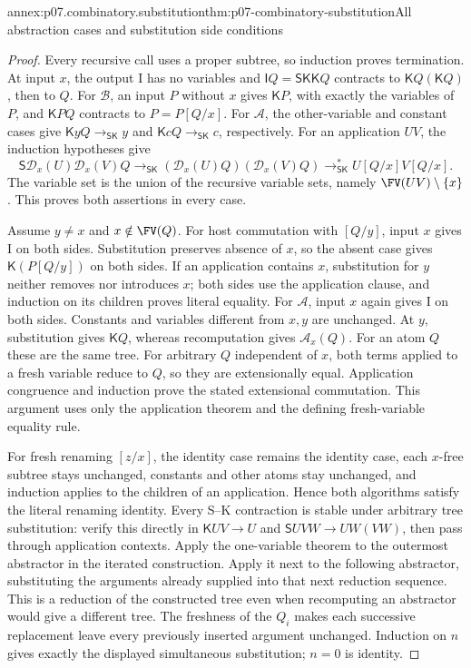 \begin{annexitem}{annex:p07.combinatory.substitution}{thm:p07-combinatory-substitution}{All abstraction cases and substitution side conditions}
\begin{proof}
Every recursive call uses a proper subtree, so induction proves termination.
At input \(x\), the output I has no variables and
\(\mathsf I Q=\mathsf S\mathsf K\mathsf KQ\) contracts to
\(\mathsf KQ(\mathsf KQ)\), then to \(Q\).
For \(\mathcal B\), an input \(P\) without \(x\) gives \(\mathsf KP\),
with exactly the variables of \(P\), and \(\mathsf KPQ\) contracts to
\(P=P[Q/x]\).  For \(\mathcal A\), the other-variable and constant cases
give \(\mathsf KyQ\longrightarrow_{\mathsf{SK}}y\) and
\(\mathsf KcQ\longrightarrow_{\mathsf{SK}}c\), respectively.
For an application \(UV\), the induction hypotheses give
\[
 \mathsf S\mathcal D_x(U)\mathcal D_x(V)Q
 \longrightarrow_{\mathsf{SK}}
 (\mathcal D_x(U)Q)(\mathcal D_x(V)Q)
 \longrightarrow_{\mathsf{SK}}^*U[Q/x]V[Q/x].
\]
The variable set is the union of the recursive variable sets, namely
\(\FV(UV)\setminus\{x\}\).  This proves both assertions in every case.

Assume \(y\ne x\) and \(x\notin\FV(Q)\).  For host commutation with
\([Q/y]\), input \(x\) gives I on both sides.  Substitution preserves absence
of \(x\), so the absent case gives \(\mathsf K(P[Q/y])\) on both sides.
If an application contains \(x\), substitution for \(y\) neither removes nor
introduces \(x\); both sides use the application clause, and induction on its
children proves literal equality.
For \(\mathcal A\), input \(x\) again gives I on both sides.
Constants and variables different from \(x,y\) are
unchanged.  At \(y\), substitution gives \(\mathsf KQ\), whereas recomputation
gives \(\mathcal A_x(Q)\).  For an atom \(Q\) these are the same tree.
For arbitrary \(Q\) independent of \(x\), both terms applied to a fresh variable
reduce to \(Q\), so they are extensionally equal.  Application congruence and
induction prove the stated extensional commutation.  This argument uses only
the application theorem and the defining fresh-variable equality rule.

For fresh renaming \([z/x]\), the identity case remains the identity case,
each \(x\)-free subtree stays unchanged, constants and other atoms stay unchanged,
and induction applies to the children of an application.  Hence both algorithms
satisfy the literal renaming identity.
Every S--K contraction is stable under arbitrary tree substitution: verify
this directly in \(\mathsf KUV\longrightarrow U\) and
\(\mathsf SUVW\longrightarrow UW(VW)\), then pass through application contexts.
Apply the one-variable theorem to the outermost abstractor in the iterated
construction.  Apply it next to the following abstractor, substituting the
arguments already supplied into that next reduction sequence.  This is a
reduction of the constructed tree even when recomputing an abstractor would
give a different tree.  The freshness of the \(Q_i\) makes each successive
replacement leave every previously inserted argument unchanged.  Induction on
\(n\) gives exactly the displayed simultaneous substitution; \(n=0\) is identity.
\end{proof}
\end{annexitem}

